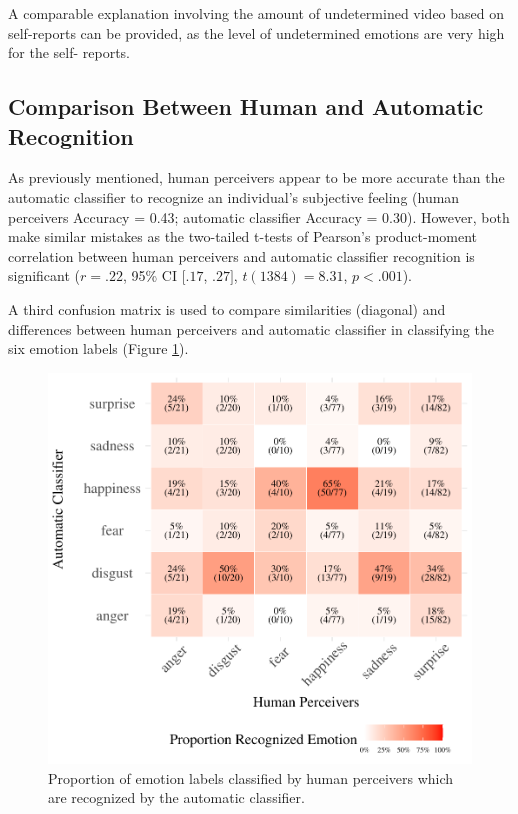 \documentclass[
  english,
  man]{apa7}
\begin{document}
A comparable explanation involving the amount of undetermined video based on self-reports can be provided, as the level of undetermined emotions are very high for the self- reports.

\hypertarget{comparison-between-human-and-automatic-recognition}{%
\subsection{Comparison Between Human and Automatic Recognition}\label{comparison-between-human-and-automatic-recognition}}

As previously mentioned, human perceivers appear to be more accurate than the automatic classifier to recognize an individual's subjective feeling (human perceivers Accuracy = 0.43; automatic classifier Accuracy = 0.30). However, both make similar mistakes as the two-tailed t-tests of Pearson's product-moment correlation between human perceivers and automatic classifier recognition is significant (\(r = .22\), 95\% CI \([.17\), \(.27]\), \(t(1384) = 8.31\), \(p < .001\)).

A third confusion matrix is used to compare similarities (diagonal) and differences between human perceivers and automatic classifier in classifying the six emotion labels (Figure \ref{fig:confusionMatrix-hr-ar}).

\begin{figure}[!h]
\includegraphics[width=\textwidth]{manuscript_apa_files/figure-latex/confusionMatrix-hr-ar-1} \caption{Proportion of emotion labels classified by human perceivers which are recognized by the automatic classifier.}\label{fig:confusionMatrix-hr-ar}
\end{figure}
\end{document}
